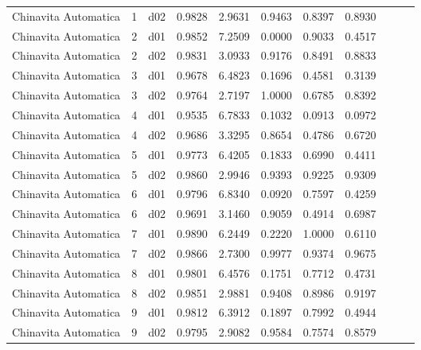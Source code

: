 \begin{landscape}
\begin{longtable}{p{2cm}rrrrrrrrrr}
 Chinavita Automatica  &          1 &     d02 &   0.9828 &  2.9631 &        0.9463 &           0.8397 &  0.8930 \\
 Chinavita Automatica  &          2 &     d01 &   0.9852 &  7.2509 &        0.0000 &           0.9033 &  0.4517 \\
 Chinavita Automatica  &          2 &     d02 &   0.9831 &  3.0933 &        0.9176 &           0.8491 &  0.8833 \\
 Chinavita Automatica  &          3 &     d01 &   0.9678 &  6.4823 &        0.1696 &           0.4581 &  0.3139 \\
 Chinavita Automatica  &          3 &     d02 &   0.9764 &  2.7197 &        1.0000 &           0.6785 &  0.8392 \\
 Chinavita Automatica  &          4 &     d01 &   0.9535 &  6.7833 &        0.1032 &           0.0913 &  0.0972 \\
 Chinavita Automatica  &          4 &     d02 &   0.9686 &  3.3295 &        0.8654 &           0.4786 &  0.6720 \\
 Chinavita Automatica  &          5 &     d01 &   0.9773 &  6.4205 &        0.1833 &           0.6990 &  0.4411 \\
 Chinavita Automatica  &          5 &     d02 &   0.9860 &  2.9946 &        0.9393 &           0.9225 &  0.9309 \\
 Chinavita Automatica  &          6 &     d01 &   0.9796 &  6.8340 &        0.0920 &           0.7597 &  0.4259 \\
 Chinavita Automatica  &          6 &     d02 &   0.9691 &  3.1460 &        0.9059 &           0.4914 &  0.6987 \\
 Chinavita Automatica  &          7 &     d01 &   0.9890 &  6.2449 &        0.2220 &           1.0000 &  0.6110 \\
 Chinavita Automatica  &          7 &     d02 &   0.9866 &  2.7300 &        0.9977 &           0.9374 &  0.9675 \\
 Chinavita Automatica  &          8 &     d01 &   0.9801 &  6.4576 &        0.1751 &           0.7712 &  0.4731 \\
 Chinavita Automatica  &          8 &     d02 &   0.9851 &  2.9881 &        0.9408 &           0.8986 &  0.9197 \\
 Chinavita Automatica  &          9 &     d01 &   0.9812 &  6.3912 &        0.1897 &           0.7992 &  0.4944 \\
 Chinavita Automatica  &          9 &     d02 &   0.9795 &  2.9082 &        0.9584 &           0.7574 &  0.8579 \\

\end{longtable}
\end{landscape}

